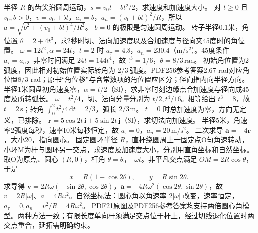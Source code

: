 \problemtext 半径 $R$ 的齿尖沿圆周运动，$s=v_0t+bt^2/2$，求速度和加速度大小。
\workings 对 $t\ge0$ 且 $v_0,b>0$，$v=v_0+bt$，$a_\tau=b$，$a_n=(v_0+bt)^2/R$，所以 $a=\sqrt{b^2+(v_0+bt)^4/R^2}$。
\crosscheck $b=0$ 的极限是匀速圆周运动。
\problemtext 转子半径0.1米，角位置 $\theta=2+4t^3$，求2秒时切、法向加速度以及合加速度与径向夹45度时的角位置。
\workings $\omega=12t^2,\alpha=24t$，$t=2$ 时 $a_\tau=4.8$，$a_n=230.4$（$\mathrm{m/s^2}$）。45度条件 $a_\tau=a_n$，非零时间满足 $24t=144t^4$，故 $t^3=1/6$，$\theta=8/3\,\mathrm{rad}$。
\crosscheck 初始角位置为2弧度，因此相对初始位置实际转角为 $2/3$ 弧度。PDF256参考答案2.67 rad对应角位置8/3 rad；原书“角位移”与含常数项的角位置应区分；径向指内向半径方向。
\problemtext 半径1米圆盘初角速度零，$\alpha=t/2$（SI），求非零时刻边缘点合加速度与径向成45度及所转弧长。
\workings $\omega=t^2/4$，切、法向分量分别为 $t/2,t^4/16$。相等给出 $t^3=8$，故 $t=2\,\mathrm s$；转角 $\int_0^2 t^2/4\,\mathrm dt=2/3$，弧长 $2/3\,\mathrm m$。
\crosscheck $t=0$ 时总加速度为零，方向无定义，已排除。
\problemtext $\bm r=5\cos2t\,\bm i+5\sin2t\,\bm j$（SI），求切法向加速度。
\workings 半径5米，角速率2弧度每秒，速率10米每秒恒定，故 $a_\tau=0$，$a_n=20\,\mathrm{m/s^2}$。
\crosscheck 二次求导 $\bm a=-4\bm r$，大小20，指向圆心。
\problemtext 固定圆环半径 $R$，直杆绕圆周上一固定点O匀角速转动，小环M为杆与圆环另一交点，求速度及加速度大小，分别用直角坐标和自然坐标。
\workings 取O为原点、圆心 $(R,0)$，杆角 $\theta=\theta_0+\omega t$。非平凡交点满足 $OM=2R\cos\theta$，于是
\[
x=R(1+\cos2\theta),\qquad y=R\sin2\theta.
\]
求导得 $\bm v=2R\omega(-\sin2\theta,\cos2\theta)$，$\bm a=-4R\omega^2(\cos2\theta,\sin2\theta)$，故 $v=2R|\omega|$、$a=4R\omega^2$。自然坐标法：圆心角以角速率 $2|\omega|$ 改变，速率恒定，$a_\tau=0,a_n=v^2/R=4R\omega^2$。
\crosscheck PDF21原图及PDF256参考答案均支持两倍圆心角模型。两种方法一致；有限长度单向杆须满足交点位于杆上，经过切线退化位置时两交点重合，延拓需明确约束。

